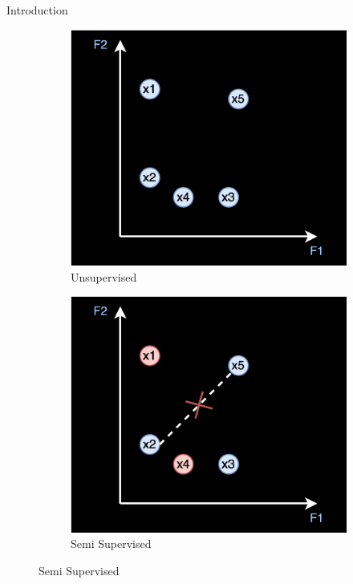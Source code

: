 \documentclass{beamer}
\begin{document}
\begin{frame}{Introduction}
    \begin{figure}
    \begin{subfigure}[b]{0.45\textwidth}
        \includegraphics[width=\textwidth]{unsup.pdf}
        \caption{Unsupervised}
        \label{fig:image1}
    \end{subfigure}
    \hfill
    \begin{subfigure}[b]{0.45\textwidth}
        \includegraphics[width=\textwidth]{ssupervised.pdf}
        \caption{Semi Supervised}
        \label{fig:image2}
    \end{subfigure}
    \label{fig:both_images}
\end{figure}

\end{frame}
\end{document}
